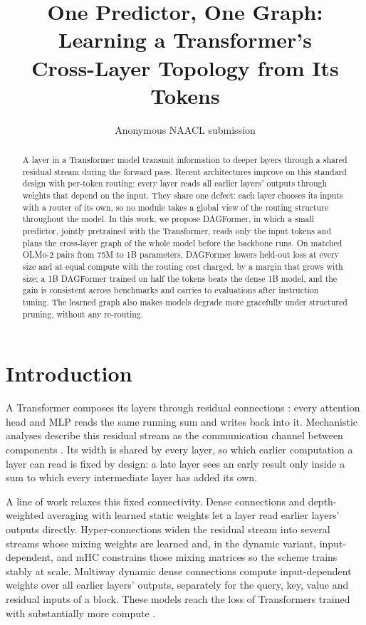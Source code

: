 \documentclass[11pt]{article}
\title{One Predictor, One Graph: Learning a Transformer's\\Cross-Layer Topology from Its Tokens}
\author{Anonymous NAACL submission}
\newcommand{\dagf}{DAGFormer}
\begin{document}
\maketitle

\begin{abstract}
A layer in a Transformer model transmit information to deeper layers through a shared residual stream during the forward pass. Recent architectures improve on this standard design with per-token routing: every layer reads all earlier layers' outputs through weights that depend on the input. They share one defect: each layer chooses its inputs with a router of its own, so no module takes a global view of the routing structure throughout the model. In this work, we propose \dagf{}, in which a small predictor, jointly pretrained with the Transformer, reads only the input tokens and plans the cross-layer graph of the whole model before the backbone runs. On matched OLMo-2 pairs from 75M to 1B parameters, \dagf{} lowers held-out loss at every size and at equal compute with the routing cost charged, by a margin that grows with size; a 1B \dagf{} trained on half the tokens beats the dense 1B model, and the gain is consistent across benchmarks and carries to evaluations after instruction tuning. The learned graph also makes models degrade more gracefully under structured pruning, without any re-routing.
\end{abstract}

\section{Introduction}

A Transformer \citep{vaswani2017} composes its layers through residual connections \citep{he2016resnet}: every attention head and MLP reads the same running sum and writes back into it. Mechanistic analyses describe this residual stream as the communication channel between components \citep{elhage2021}. Its width is shared by every layer, so which earlier computation a layer can read is fixed by design: a late layer sees an early result only inside a sum to which every intermediate layer has added its own.

A line of work relaxes this fixed connectivity. Dense connections \citep{huang2017densenet} and depth-weighted averaging with learned static weights \citep{pagliardini2024denseformer} let a layer read earlier layers' outputs directly. Hyper-connections \citep{zhu2024hyperconnections} widen the residual stream into several streams whose mixing weights are learned and, in the dynamic variant, input-dependent, and mHC \citep{mhc2026} constrains those mixing matrices so the scheme trains stably at scale. Multiway dynamic dense connections \citep{muddformer2025} compute input-dependent weights over all earlier layers' outputs, separately for the query, key, value and residual inputs of a block. These models reach the loss of Transformers trained with substantially more compute \citep{zhu2024hyperconnections,muddformer2025}.
\end{document}
